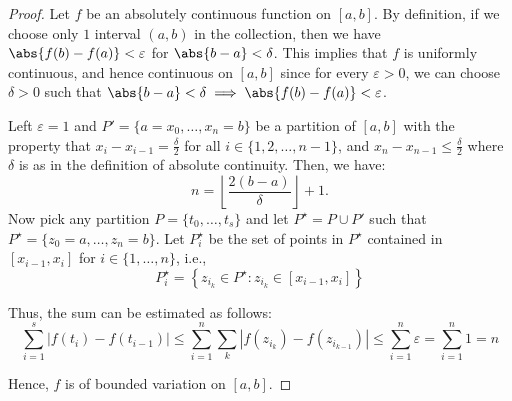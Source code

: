 \documentclass{article}
\begin{document}
\begin{proof}
    Let $f$ be an absolutely continuous function on $\left[a, b\right]$. By definition, if we choose only $1$ interval $(a, b)$ in the collection, then we have $\abs{f(b) - f(a)} < \varepsilon$ for $\abs{b - a} < \delta$. This implies that $f$ is uniformly continuous, and hence continuous on $\left[a, b\right]$ since for every $\varepsilon > 0$, we can choose $\delta > 0$ such that $\abs{b - a} < \delta \implies \abs{f(b) - f(a)} < \varepsilon$.

    Left \(\varepsilon = 1\) and \( P' = \{a = x_0, \ldots, x_n = b\} \) be a partition of \([a,b]\) with the property that \( x_i - x_{i-1} = \frac{\delta}{2} \) for all \( i \in \{1, 2, \ldots, n-1\} \), and \( x_n - x_{n-1} \leq \frac{\delta}{2} \) where $\delta$ is as in the definition of absolute continuity. Then, we have:
    \[
    n = \left\lfloor \dfrac{2(b - a)}{\delta} \right\rfloor + 1.
    \]
    Now pick any partition \( P = \{t_0,\ldots,t_s\} \) and let \( P^{\star} = P \cup P' \) such that \( P^{\star} = \{z_0 = a, \ldots, z_n = b\} \). Let \( P^{\star}_i \) be the set of points in \( P^{\star} \) contained in \([x_{i-1}, x_i]\) for \( i \in \{1,\ldots,n\} \), i.e.,
    \[
    P^{\star}_i = \left\{ z_{i_k} \in P^{\star} : z_{i_k} \in [x_{i-1}, x_i] \right\}
    \]

    Thus, the sum can be estimated as follows:
    \[
    \sum_{i=1}^s |f(t_i) - f(t_{i-1})| \leq \sum_{i=1}^{n} \sum_{k} |f(z_{i_k}) - f(z_{i_{k-1}})| \leq \sum_{i = 1}^{n} \varepsilon = \sum_{i = 1}^{n} 1 = n
    \]

    Hence, \( f \) is of bounded variation on \([a,b]\).
\end{proof}
\end{document}
